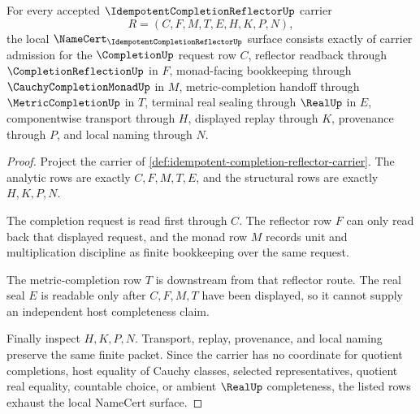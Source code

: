 \begin{theorem}
\label{thm:idempotent-completion-reflector-namecert-obligations}
For every accepted $\IdempotentCompletionReflectorUp$ carrier
$$
R=(C,F,M,T,E,H,K,P,N),
$$
the local $\NameCert_{\IdempotentCompletionReflectorUp}$ surface consists exactly of carrier admission for the $\CompletionUp$ request row $C$, reflector readback through $\CompletionReflectionUp$ in $F$, monad-facing bookkeeping through $\CauchyCompletionMonadUp$ in $M$, metric-completion handoff through $\MetricCompletionUp$ in $T$, terminal real sealing through $\RealUp$ in $E$, componentwise transport through $H$, displayed replay through $K$, provenance through $P$, and local naming through $N$.
\end{theorem}
\begin{proof}
Project the carrier of \autoref{def:idempotent-completion-reflector-carrier}. The analytic rows are exactly $C,F,M,T,E$, and the structural rows are exactly $H,K,P,N$.

The completion request is read first through $C$. The reflector row $F$ can only read back that displayed request, and the monad row $M$ records unit and multiplication discipline as finite bookkeeping over the same request.

The metric-completion row $T$ is downstream from that reflector route. The real seal $E$ is readable only after $C,F,M,T$ have been displayed, so it cannot supply an independent host completeness claim.

Finally inspect $H,K,P,N$. Transport, replay, provenance, and local naming preserve the same finite packet. Since the carrier has no coordinate for quotient completions, host equality of Cauchy classes, selected representatives, quotient real equality, countable choice, or ambient $\RealUp$ completeness, the listed rows exhaust the local NameCert surface.
\end{proof}

